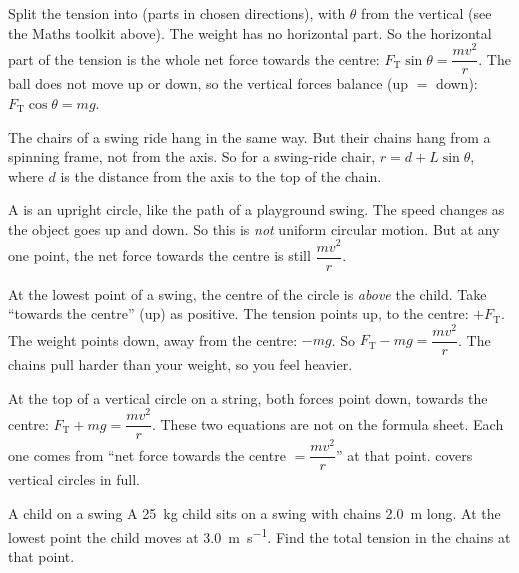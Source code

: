 Split the tension into  (parts in chosen directions), with $\theta$ from the
vertical (see the Maths toolkit above). The weight has no horizontal part. So the horizontal
part of the tension is the whole net force towards the centre:
$F_\mathrm{T}\sin\theta = \dfrac{mv^2}{r}$. The ball does not move up or down, so the vertical
forces balance (up $=$ down): $F_\mathrm{T}\cos\theta = mg$.

The chairs of a swing ride hang in the same way. But their chains hang from a spinning
frame, not from the axis. So for a swing-ride chair, $r = d + L\sin\theta$, where $d$ is the
distance from the axis to the top of the chain.

A  is an upright circle, like the path of a playground swing. The
speed changes as the object goes up and down. So this is \emph{not} uniform circular motion.
But at any one point, the net force towards the centre is still $\dfrac{mv^2}{r}$.

At the lowest point of a swing, the centre of the circle is \emph{above} the child. Take
``towards the centre'' (up) as positive. The tension points up, to the centre: $+F_\mathrm{T}$.
The weight points down, away from the centre: $-mg$. So $F_\mathrm{T} - mg = \dfrac{mv^2}{r}$.
The chains pull harder than your weight, so you feel heavier.

At the top of a vertical circle on a string, both forces point down, towards the centre:
$F_\mathrm{T} + mg = \dfrac{mv^2}{r}$. These two equations are not on the formula sheet. Each
one comes from ``net force towards the centre $= \dfrac{mv^2}{r}$'' at that point.
 covers vertical circles in full.

\begin{workedexample}{A child on a swing}\label{ch2:we:swing}
A \qty{25}{kg} child sits on a swing with chains \qty{2.0}{m} long. At the lowest point the
child moves at \qty{3.0}{m.s^{-1}}. Find the total tension in the chains at that point.
\end{workedexample}

